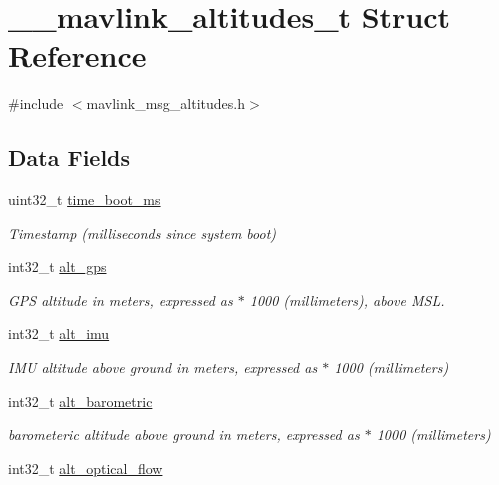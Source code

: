 \hypertarget{struct____mavlink__altitudes__t}{\section{\+\_\+\+\_\+mavlink\+\_\+altitudes\+\_\+t Struct Reference}
\label{struct____mavlink__altitudes__t}
}


{\ttfamily \#include $<$mavlink\+\_\+msg\+\_\+altitudes.\+h$>$}

\subsection*{Data Fields}
\begin{DoxyCompactItemize}
\item 
uint32\+\_\+t \hyperlink{struct____mavlink__altitudes__t_acca23c26c65fd180317986306f24e7f6}{time\+\_\+boot\+\_\+ms}
\begin{DoxyCompactList}\small\item\em Timestamp (milliseconds since system boot) \end{DoxyCompactList}\item 
int32\+\_\+t \hyperlink{struct____mavlink__altitudes__t_a6d9065ed73e442a98877bd5ceae1ec62}{alt\+\_\+gps}
\begin{DoxyCompactList}\small\item\em G\+P\+S altitude in meters, expressed as $\ast$ 1000 (millimeters), above M\+S\+L. \end{DoxyCompactList}\item 
int32\+\_\+t \hyperlink{struct____mavlink__altitudes__t_a66967f5b3bd7335be6766f56014156ce}{alt\+\_\+imu}
\begin{DoxyCompactList}\small\item\em I\+M\+U altitude above ground in meters, expressed as $\ast$ 1000 (millimeters) \end{DoxyCompactList}\item 
int32\+\_\+t \hyperlink{struct____mavlink__altitudes__t_a6144fda62af98aa055b2e93031bb434b}{alt\+\_\+barometric}
\begin{DoxyCompactList}\small\item\em barometeric altitude above ground in meters, expressed as $\ast$ 1000 (millimeters) \end{DoxyCompactList}\item 
int32\+\_\+t \hyperlink{struct____mavlink__altitudes__t_a370a2be568401a5e530e3a51c4ec461f}{alt\+\_\+optical\+\_\+flow}

\end{DoxyCompactItemize}
